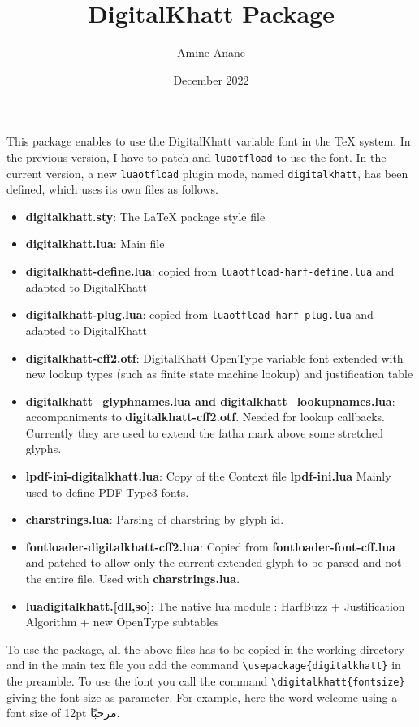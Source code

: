 \documentclass{article}
\title{DigitalKhatt \LuaLaTeX{} Package}
\date{December 2022}
\author{Amine Anane}
\newcommand{\DigitalKhatt}{DigitalKhatt}
\newcommand{\LuaOTFLoad}{\mbox{\texttt{luaotfload}}}
\begin{document}
\maketitle
This \LuaLaTeX{} package enables to use the \DigitalKhatt{} variable font in the \TeX{} system. In the previous version, I have to patch \LuaTeX{} and \LuaOTFLoad{} to use the font.
In the current version, a new \LuaOTFLoad{} plugin mode, named \mbox{\texttt{digitalkhatt}}, has been defined, which uses its own files as follows.
\begin{itemize}
  \item {\bf digitalkhatt.sty}: The \LaTeX{} package style file
  \item {\bf digitalkhatt.lua}: Main file
  \item {\bf digitalkhatt-define.lua}: copied from \mbox{\texttt{luaotfload-harf-define.lua}} and adapted to \DigitalKhatt{}
  \item {\bf digitalkhatt-plug.lua}: copied from \mbox{\texttt{luaotfload-harf-plug.lua}} and adapted to \DigitalKhatt{}
  \item {\bf digitalkhatt-cff2.otf}: DigitalKhatt OpenType variable font extended with new lookup types (such as finite state machine lookup) and justification table
  \item {\bf digitalkhatt\_glyphnames.lua and digitalkhatt\_lookupnames.lua}: accompaniments to {\bf digitalkhatt-cff2.otf}. Needed for lookup callbacks.
    Currently they are used to extend the fatha mark above some stretched glyphs.
  \item {\bf lpdf-ini-digitalkhatt.lua}: Copy of the Context file {\bf lpdf-ini.lua} Mainly  used to define PDF Type3 fonts.
  \item {\bf charstrings.lua}: Parsing of charstring by glyph id.
  \item {\bf fontloader-digitalkhatt-cff2.lua}: Copied from {\bf fontloader-font-cff.lua} and patched to allow only the current extended glyph to be parsed and not the entire file. Used with {\bf charstrings.lua}.
  \item {\bf luadigitalkhatt.[dll,so]}: The native lua module : HarfBuzz + Justification Algorithm + new OpenType subtables 
\end{itemize}
To use the package, all the above files has to be copied in the working directory and in the main tex file you add the command \verb!\usepackage{digitalkhatt}! in the preamble.
To use the font you call the command \verb!\digitalkhatt{fontsize}! giving the font size as parameter. For example, here the word welcome using a font size of 12pt {\digitalkhatt{12pt}مرحبًا}.
\end{document}
